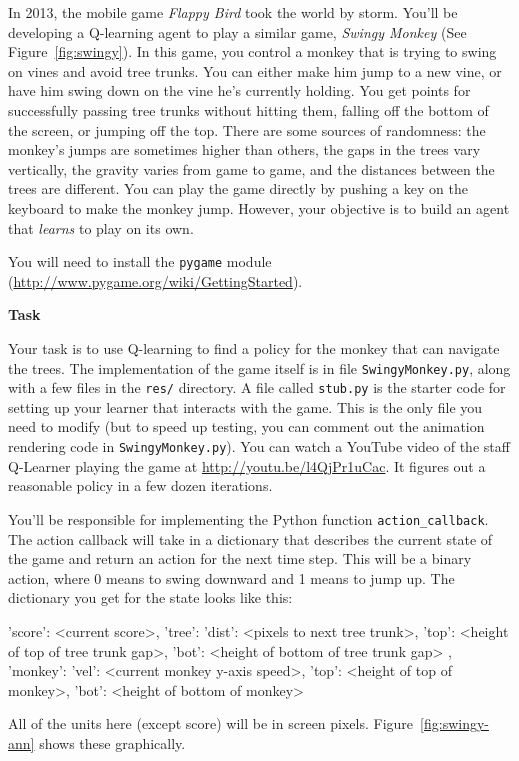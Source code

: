 \documentclass[submit]{harvardml}
\begin{document}
\begin{problem}
  In 2013, the mobile game \emph{Flappy Bird} took the world by storm. You'll be developing a Q-learning agent to play a similar game, \emph{Swingy Monkey} (See Figure~\ref{fig:swingy}).  In this game, you control a monkey that is trying to swing on vines and avoid tree trunks.  You can either make him jump to a new vine, or have him swing down on the vine he's currently holding.  You get points for successfully passing tree trunks without hitting them, falling off the bottom of the screen, or jumping off the top.  There are some sources of randomness: the monkey's jumps are sometimes higher than others, the gaps in the trees vary vertically, the gravity varies from game to game, and the distances between the trees are different.  You can play the game directly by pushing a key on the keyboard to make the monkey jump.  However, your objective is to build an agent that \emph{learns} to play on its own. 
  
   You will need to install the \verb|pygame| module
  (\url{http://www.pygame.org/wiki/GettingStarted}).

\textbf{Task}

Your task is to use Q-learning to find a policy for the monkey that can navigate the trees.  The implementation of the game itself is in file \verb|SwingyMonkey.py|, along with a few files in the \verb|res/| directory.  A file called \verb|stub.py| is the starter code for setting up your learner that interacts with the game.  This is the only file you need to modify (but to speed up testing, you can comment out the animation rendering code in \verb|SwingyMonkey.py|). You can watch a YouTube video of the staff Q-Learner playing the game at \url{http://youtu.be/l4QjPr1uCac}.  It figures out a reasonable policy in a few dozen iterations.

You'll be responsible for implementing the Python function  \verb|action_callback|. The action callback will take in a dictionary that describes the current state of the game and return an action for the next time step.  This will be a binary action, where 0 means to swing downward and 1 means to jump up.  The dictionary you get for the state looks like this:
\begin{csv}
{ 'score': <current score>,
  'tree': { 'dist': <pixels to next tree trunk>,
            'top':  <height of top of tree trunk gap>,
            'bot':  <height of bottom of tree trunk gap> },
  'monkey': { 'vel': <current monkey y-axis speed>,
              'top': <height of top of monkey>,
              'bot': <height of bottom of monkey> }}
\end{csv}
All of the units here (except score) will be in screen pixels. Figure~\ref{fig:swingy-ann} shows these graphically. 


\end{problem}
\end{document}
